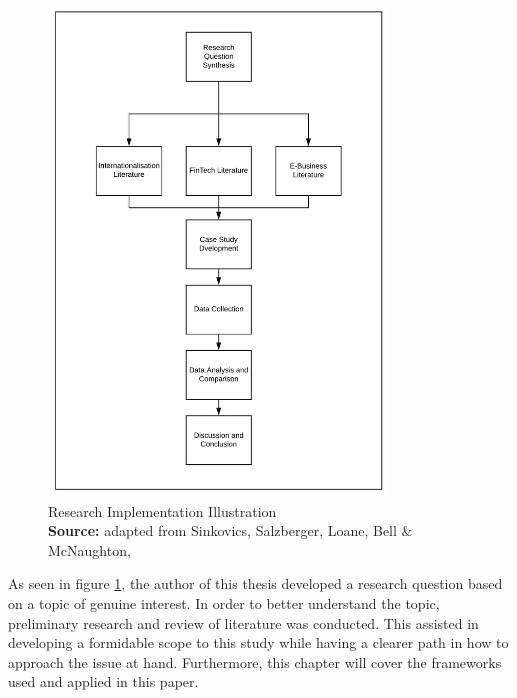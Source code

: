 \documentclass[11pt,a4paper]{article}
\newcommand*{\captionsource}[2]{%
  \caption[{#1}]{%
    #1%
    \\\hspace{\linewidth}%
    \textbf{Source:} #2%
  }%
}
\begin{document}
{{\begin{figure}[H]
	\centering
  \includegraphics[width=90mm]{figures/fig_research_plan}
  \vspace{5mm}
    \captionsetup{justification=centering,margin=2cm}
      \captionsource{Research Implementation Illustration}{adapted from Sinkovics, Salzberger, Loane, Bell \& McNaughton, \citeyear{sinkovicsEmployingInformationCommunication2006}}
	\label{fig:research_plan}
\end{figure}


As seen in figure \ref{fig:research_plan}, the author of this thesis developed a research question based on a topic of genuine interest. In order to better understand the topic, preliminary research and review of literature was conducted. This assisted in developing a formidable scope to this study while having a clearer path in how to approach the issue at hand. Furthermore, this chapter will cover the frameworks used and applied in this paper.


}}
\end{document}
